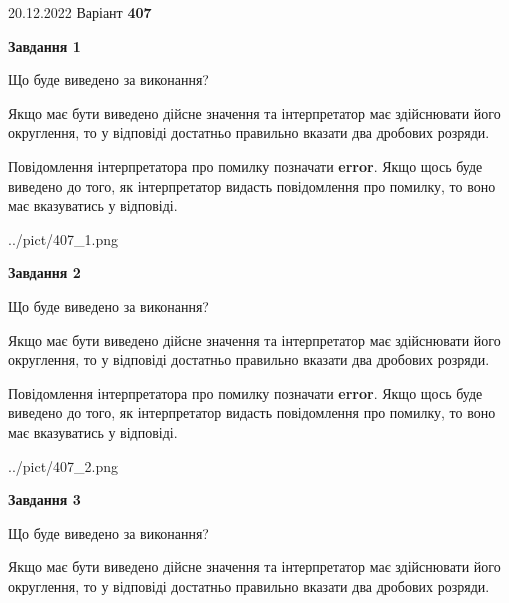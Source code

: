 \documentclass[12pt, ukrainian]{article}
\begin{document}
{20.12.2022 Варіант \No \textbf { 407 }\par}
{
\begin {Large}

{\begin {center}\textbf{Завдання 1}\end {center}}\par
Що буде виведено за виконання? \par

Якщо має бути виведено дійсне значення та інтерпретатор має здійснювати його округлення, 
то у відповіді достатньо правильно вказати два дробових розряди.

Повідомлення інтерпретатора про помилку позначати \textbf{error}.
Якщо щось буде виведено до того, як інтерпретатор видасть повідомлення про помилку, 
то воно має вказуватись у відповіді. \par

\begin{center}
	{../pict/407_1.png}
\end{center}
\newpage

{\begin {center}\textbf{Завдання 2}\end {center}}\par
Що буде виведено за виконання? \par

Якщо має бути виведено дійсне значення та інтерпретатор має здійснювати його округлення, 
то у відповіді достатньо правильно вказати два дробових розряди.

Повідомлення інтерпретатора про помилку позначати \textbf{error}.
Якщо щось буде виведено до того, як інтерпретатор видасть повідомлення про помилку, 
то воно має вказуватись у відповіді. \par

\begin{center}
	{../pict/407_2.png}
\end{center}
\newpage

{\begin {center}\textbf{Завдання 3}\end {center}}\par
Що буде виведено за виконання? \par

Якщо має бути виведено дійсне значення та інтерпретатор має здійснювати його округлення, 
то у відповіді достатньо правильно вказати два дробових розряди.


\end{Large}}
\end{document}
